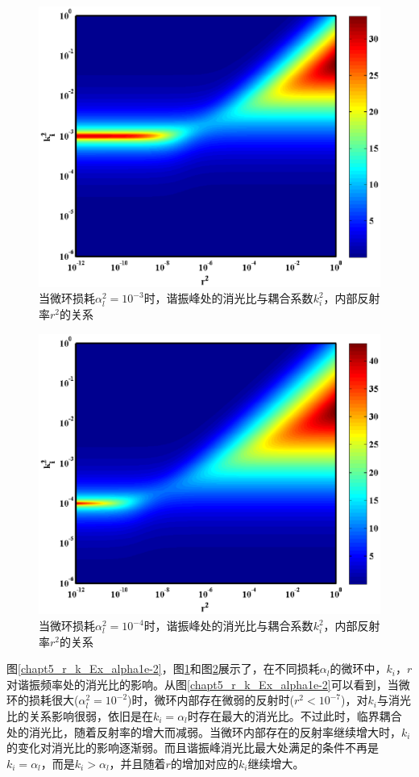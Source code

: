 \begin{figure}[htb]
	\centering
	\includegraphics[width=12cm]{./Pictures/chapt5_r_k_Ex_alpha1e-3.eps}
	\caption{当微环损耗$\alpha_l^2= 10^{-3}$时，谐振峰处的消光比与耦合系数$k_i^2$，内部反射率$r^2$的关系}
	\label{chapt5_r_k_Ex_alpha1e-3}
\end{figure}
\begin{figure}[htb]
	\centering
	\includegraphics[width=12cm]{./Pictures/chapt5_r_k_Ex_alpha1e-4.eps}
	\caption{当微环损耗$\alpha_l^2= 10^{-4}$时，谐振峰处的消光比与耦合系数$k_i^2$，内部反射率$r^2$的关系}
	\label{chapt5_r_k_Ex_alpha1e-4}
\end{figure}
图\ref{chapt5_r_k_Ex_alpha1e-2}，图\ref{chapt5_r_k_Ex_alpha1e-3}和图\ref{chapt5_r_k_Ex_alpha1e-4}展示了，在不同损耗$\alpha_l$的微环中，$k_i$，$r$对谐振频率处的消光比的影响。从图\ref{chapt5_r_k_Ex_alpha1e-2}可以看到，当微环的损耗很大($\alpha_l^2 = 10^{-2}$)时，微环内部存在微弱的反射时($r^2<10^{-7}$)，对$k_i$与消光比的关系影响很弱，依旧是在$k_i=\alpha_l$时存在最大的消光比。不过此时，临界耦合处的消光比，随着反射率的增大而减弱。当微环内部存在的反射率继续增大时，$k_i$的变化对消光比的影响逐渐弱。而且谐振峰消光比最大处满足的条件不再是$k_i = \alpha_l$，而是$k_i > \alpha_l$，并且随着$r$的增加对应的$k_i$继续增大。

